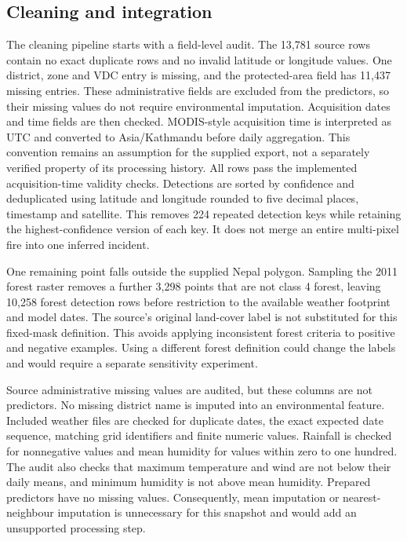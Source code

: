 \documentclass[conference,a4paper]{IEEEtran}
\begin{document}
\subsection{Cleaning and integration}
The cleaning pipeline starts with a field-level audit. The 13,781 source rows contain no exact duplicate rows and no invalid latitude or longitude values. One district, zone and VDC entry is missing, and the protected-area field has 11,437 missing entries. These administrative fields are excluded from the predictors, so their missing values do not require environmental imputation. Acquisition dates and time fields are then checked. MODIS-style acquisition time is interpreted as UTC and converted to Asia/Kathmandu before daily aggregation. This convention remains an assumption for the supplied export, not a separately verified property of its processing history. All rows pass the implemented acquisition-time validity checks. Detections are sorted by confidence and deduplicated using latitude and longitude rounded to five decimal places, timestamp and satellite. This removes 224 repeated detection keys while retaining the highest-confidence version of each key. It does not merge an entire multi-pixel fire into one inferred incident.

One remaining point falls outside the supplied Nepal polygon. Sampling the 2011 forest raster removes a further 3,298 points that are not class 4 forest, leaving 10,258 forest detection rows before restriction to the available weather footprint and model dates. The source's original land-cover label is not substituted for this fixed-mask definition. This avoids applying inconsistent forest criteria to positive and negative examples. Using a different forest definition could change the labels and would require a separate sensitivity experiment.

Source administrative missing values are audited, but these columns are not predictors. No missing district name is imputed into an environmental feature. Included weather files are checked for duplicate dates, the exact expected date sequence, matching grid identifiers and finite numeric values. Rainfall is checked for nonnegative values and mean humidity for values within zero to one hundred. The audit also checks that maximum temperature and wind are not below their daily means, and minimum humidity is not above mean humidity. Prepared predictors have no missing values. Consequently, mean imputation or nearest-neighbour imputation is unnecessary for this snapshot and would add an unsupported processing step.
\end{document}
